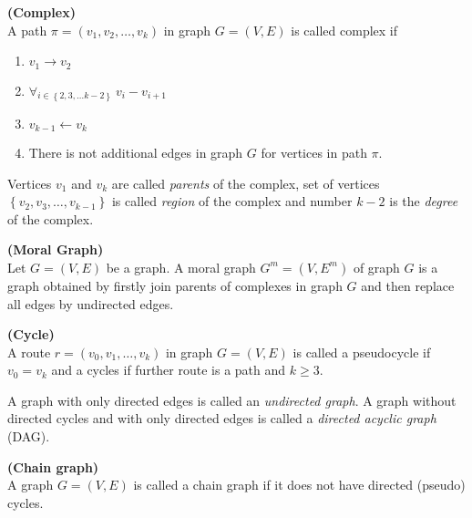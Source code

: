 \begin{defi} \label{complexDef} {\textbf{(Complex)}} \\
	A path $\pi = (v_1, v_2, \dots, v_k)$ in graph $G = (V, E)$ is called complex if
	\begin{enumerate}
		\item $v_1 \rightarrow v_2$
		\item $\forall_{i \in \left\{ 2, 3, \dots k-2 \right\}} \ v_i - v_{i+1}$
		\item $v_{k-1} \leftarrow v_k$
		\item There is not additional edges in graph $G$ for vertices in path $\pi$.
	\end{enumerate}
	Vertices $v_1$ and $v_k$ are called \textit{parents} of the complex, set of vertices 
	$\left\{v_2, v_3, \dots, v_{k-1} \right\}$ is called \textit{region} of the complex and number
	$k-2$ is the \textit{degree} of the complex.
\end{defi}


\begin{defi} \label{moralGraphDef} {\textbf{(Moral Graph)}} \\
	Let $G = (V, E)$ be a graph. A moral graph $G^{m} = (V, E^{m})$ of graph $G$ is a graph obtained by firstly join parents of complexes in graph $G$ and then replace all edges by undirected edges.
\end{defi}


\begin{defi} {\textbf{(Cycle)}} \\
	A route $r = (v_0, v_1, \dots, v_k)$ in graph $G = (V, E)$ is called a pseudocycle if $v_0 = v_k$ and 
	a cycles if further route is a path and $k \ge 3$.
\end{defi}

A graph with only directed edges is called an \textit{undirected graph}. A graph without directed cycles 
and with only directed edges is called a \textit{directed acyclic graph} (DAG).


\begin{defi}\label{chainGraphDef} {\textbf{(Chain graph)}}  \\
	A graph $G = (V, E)$ is called a chain graph if it does not have directed (pseudo) cycles.
\end{defi}



